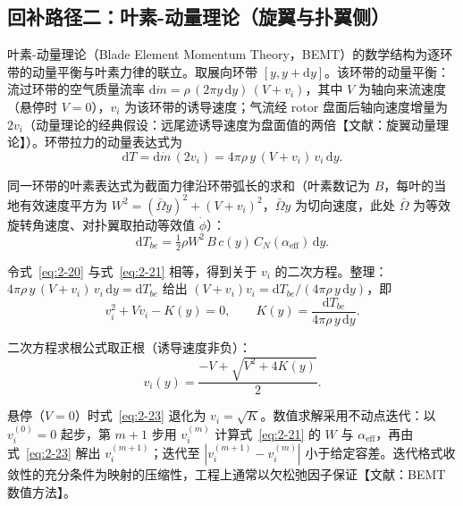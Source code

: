 \documentclass[11pt,a4paper]{ctexart}
\numberwithin{equation}{section}
\begin{document}
\subsection{回补路径二：叶素-动量理论（旋翼与扑翼侧）}

叶素-动量理论（Blade Element Momentum Theory，BEMT）的数学结构为逐环带的动量平衡与叶素力律的联立。取展向环带 $[y, y + \mathrm{d}y]$。该环带的动量平衡：流过环带的空气质量流率 $\mathrm{d}\dot{m} = \rho\,(2\pi y\,\mathrm{d}y)\,(V + v_i)$，其中 $V$ 为轴向来流速度（悬停时 $V = 0$），$v_i$ 为该环带的诱导速度；气流经 rotor 盘面后轴向速度增量为 $2v_i$（动量理论的经典假设：远尾迹诱导速度为盘面值的两倍【文献：旋翼动量理论】）。环带拉力的动量表达式为
\begin{equation}
  \mathrm{d}T = \mathrm{d}\dot{m}\,(2v_i) = 4\pi\rho\, y\,(V + v_i)\, v_i\,\mathrm{d}y. \label{eq:2-20}
\end{equation}

同一环带的叶素表达式为截面力律沿环带弧长的求和（叶素数记为 $B$，每叶的当地有效速度平方为 $W^2 = (\bar{\Omega}y)^2 + (V + v_i)^2$，$\bar{\Omega}y$ 为切向速度，此处 $\bar{\Omega}$ 为等效旋转角速度、对扑翼取拍动等效值 $\dot{\phi}$）：
\begin{equation}
  \mathrm{d}T_{be} = \tfrac{1}{2}\rho W^2\, B\, c(y)\, C_N(\alpha_{\text{eff}})\,\mathrm{d}y. \label{eq:2-21}
\end{equation}

令式~\eqref{eq:2-20} 与式~\eqref{eq:2-21} 相等，得到关于 $v_i$ 的二次方程。整理：$4\pi\rho\, y\,(V + v_i)\, v_i\,\mathrm{d}y = \mathrm{d}T_{be}$ 给出 $(V + v_i)v_i = \mathrm{d}T_{be}/(4\pi\rho\, y\,\mathrm{d}y)$，即
\begin{equation}
  v_i^2 + Vv_i - K(y) = 0, \qquad K(y) = \frac{\mathrm{d}T_{be}}{4\pi\rho\, y\,\mathrm{d}y}. \label{eq:2-22}
\end{equation}

二次方程求根公式取正根（诱导速度非负）：
\begin{equation}
  v_i(y) = \frac{-V + \sqrt{V^2 + 4K(y)}}{2}. \label{eq:2-23}
\end{equation}

悬停（$V = 0$）时式~\eqref{eq:2-23} 退化为 $v_i = \sqrt{K}$。数值求解采用不动点迭代：以 $v_i^{(0)} = 0$ 起步，第 $m+1$ 步用 $v_i^{(m)}$ 计算式~\eqref{eq:2-21} 的 $W$ 与 $\alpha_{\text{eff}}$，再由式~\eqref{eq:2-23} 解出 $v_i^{(m+1)}$\nobreak；迭代至 $|v_i^{(m+1)} - v_i^{(m)}|$ 小于给定容差。迭代格式收敛性的充分条件为映射的压缩性，工程上通常以欠松弛因子保证【文献：BEMT 数值方法】。
\end{document}
